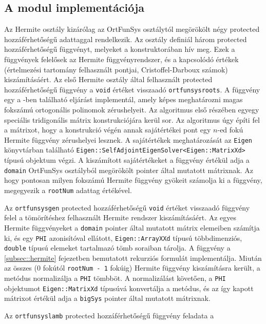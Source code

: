 \documentclass[oneside,titlepage,12pt,a4paper]{report}
\begin{document}
\subsection*{A modul implementációja}

\par Az Hermite osztály kizárólag az OrtFunSys osztálytól megörökölt négy protected hozzáférhetőségű adattaggal rendelkezik. 
Az osztály definiál három protected hozzáférhetőségű függvényt, melyeket a konstruktorában hív meg. Ezek a függvények felelősek az Hermite függvényrendszer, és a kapcsolódó értékek (értelmezési tartomány felhasznált pontjai, Cristoffel-Darboux számok) kiszámításáért. 
Az első Hermite osztály által felhasznált protected hozzáférhetőségű függvény a \texttt{void} értéket visszaadó \texttt{ortfunsysroots}.
A függvény egy a \cite{gautschi}-ben található eljárást implementál, amely képes meghatározni magas fokszámú ortogonális polinomok zérushelyeit. Az algoritmus első részében egyegy speciális tridigonális mátrix konstrukciójára kerül sor. Az algoritmus úgy építi fel a mátrixot, hogy a konstrukció végén annak sajátértékei pont egy $n$-ed fokú Hermite függvény zérushelyei lesznek. A sajátértékek meghatározását az \texttt{Eigen} könyvtárban található \texttt{Eigen::SelfAdjointEigenSolver<Eigen::MatrixXd>} típusú objektum végzi. A kiszámított sajátértékeket a függvény értékül adja a \texttt{domain} OrtFunSys osztályból megörökölt pointer által mutatott mátrixnak. Az hogy pontosan milyen fokszámú Hermite függvény gyökeit számolja ki a függvény, megegyezik a \texttt{rootNum} adattag értékével.   
\par Az \texttt{ortfunsysgen} protected hozzáférhetőségű \texttt{void} értéket visszaadó függvény felel a tömörítéshez felhasznált Hermite rendszer kiszámításáért. Az egyes Hermite függvényeket a \texttt{domain} pointer által mutatott mátrix elemeiben számítja ki, és egy \texttt{PHI} azonisítóval ellátott, \texttt{Eigen::ArrayXXd} típusú többdimenziós, \texttt{double} típusú elemeket tartalmazó tömb soraiban tárolja. A függvény a \ref{subsec::hermite} fejezetben bemutatott rekurziós formulát implementálja. Miután az összes (0 fokútól \texttt{rootNum - 1} fokúig) Hermite függvény kiszámításra került, a metódus normalizálja a \texttt{PHI} tömbböt. A normalizálást követően, a \texttt{PHI} objektumot \texttt{Eigen::MatrixXd} típusúvá konvertálja a metódus, és az így kapott mátrixot értékül adja a \texttt{bigSys} pointer által mutatott mátrixnak.
\par Az \texttt{ortfunsyslamb} protected hozzáférhetőségű függvény feladata a
\end{document}
